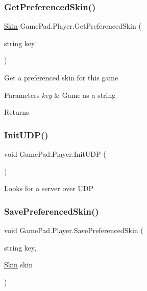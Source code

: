 \subsubsection{\texorpdfstring{GetPreferencedSkin()}{GetPreferencedSkin()}}
{\footnotesize\ttfamily \mbox{\hyperlink{class_skin}{Skin}} Game\+Pad.\+Player.\+Get\+Preferenced\+Skin (\begin{DoxyParamCaption}\item[{string}]{key }\end{DoxyParamCaption})}



Get a preferenced skin for this game 


\begin{DoxyParams}{Parameters}
{\em key} & Game as a string\\
\hline
\end{DoxyParams}
\begin{DoxyReturn}{Returns}

\end{DoxyReturn}
\mbox{\label{class_game_pad_1_1_player_acaaa78dc94fecedd9df486c55c5d2d14}} 
\subsubsection{\texorpdfstring{InitUDP()}{InitUDP()}}
{\footnotesize\ttfamily void Game\+Pad.\+Player.\+Init\+U\+DP (\begin{DoxyParamCaption}{ }\end{DoxyParamCaption})}



Looks for a server over U\+DP 

\mbox{\label{class_game_pad_1_1_player_a7705aed9995934feca3ff7ac798f52ed}} 
\subsubsection{\texorpdfstring{SavePreferencedSkin()}{SavePreferencedSkin()}}
{\footnotesize\ttfamily void Game\+Pad.\+Player.\+Save\+Preferenced\+Skin (\begin{DoxyParamCaption}\item[{string}]{key,  }\item[{\mbox{\hyperlink{class_skin}{Skin}}}]{skin }\end{DoxyParamCaption})}




